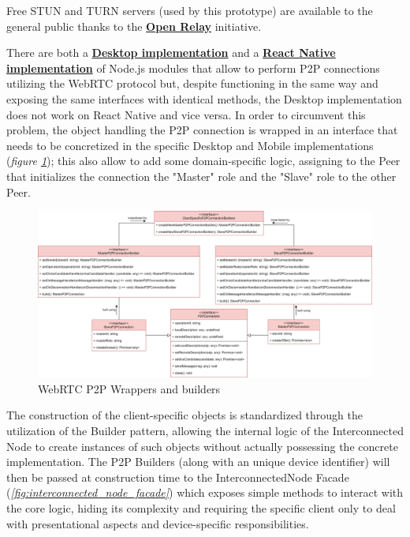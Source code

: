 Free STUN and TURN servers (used by this prototype) are available to the general public thanks to the \textbf{\href{https://www.metered.ca/tools/openrelay/}{Open Relay}} initiative.

There are both a \textbf{\href{https://www.npmjs.com/package/wrtc}{Desktop implementation}} and a \textbf{\href{https://www.npmjs.com/package/react-native-webrtc}{React Native implementation}} of Node.js modules that allow to perform P2P connections utilizing the WebRTC protocol but, despite functioning in the same way and exposing the same interfaces with identical methods, the Desktop implementation does not work on React Native and vice versa. In order to circumvent this problem, the object handling the P2P connection is wrapped in an interface that needs to be concretized in the specific Desktop and Mobile implementations (\textit{figure \ref{fig:p2p_wrapper}}); this also allow to add some domain-specific logic, assigning to the Peer that initializes the connection the "Master" role and the "Slave" role to the other Peer. 

\begin{figure}[!ht]
    \centering
    \includegraphics[width=\linewidth]{document/chapters/chapter_7/images/p2p_wrapper.png}
    \caption{WebRTC P2P Wrappers and builders}
    \label{fig:p2p_wrapper}
\end{figure}

The construction of the client-specific objects is standardized through the utilization of the Builder pattern, allowing the internal logic of the Interconnected Node to create instances of such objects without actually possessing the concrete implementation. The P2P Builders (along with an unique device identifier) will then be passed at construction time to the InterconnectedNode Facade (\textit{\ref{fig:interconnected_node_facade}}) which exposes simple methods to interact with the core logic, hiding its complexity and requiring the specific client only to deal with presentational aspects and device-specific responsibilities.

